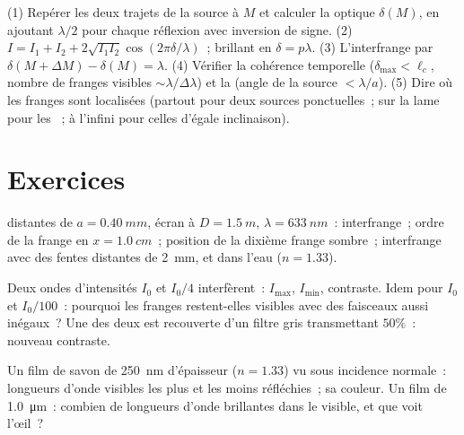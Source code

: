 \begin{method}\label{met:b2:two-wave-interference:method}
(1) Repérer les deux trajets de la source à $M$ et calculer la
 optique $\delta(M)$, en ajoutant $\lambda/2$ pour chaque réflexion
avec inversion de signe. (2) $I = I_1 + I_2 + 2\sqrt{I_1I_2}\cos(2\pi\delta/\lambda)$~;
brillant en $\delta = p\lambda$. (3) L'interfrange par $\delta(M + \Delta M) - \delta(M) =
\lambda$. (4) Vérifier la cohérence temporelle ($\delta_{\max} < \ell_c$, nombre de
franges visibles $\sim\lambda/\Delta\lambda$) et la  (angle de la source
$< \lambda/a$). (5) Dire où les franges sont localisées (partout pour deux
sources ponctuelles~; sur la lame pour les ~; à l'infini
pour celles d'égale inclinaison).
\end{method}

\section{Exercices}

\begin{exercise}[$\star$]\label{exo:b2:two-wave-interference:1}
 distantes de $a = \qty{0.40}{mm}$, écran à $D = \qty{1.5}{m}$, $\lambda =
\qty{633}{nm}$~: interfrange~; ordre de la frange en $x = \qty{1.0}{cm}$~; position
de la dixième frange sombre~; interfrange avec des fentes distantes de \qty{2}{mm},
et dans l'eau ($n = 1.33$).
\end{exercise}

\begin{exercise}[$\star$]\label{exo:b2:two-wave-interference:2}
Deux ondes d'intensités $I_0$ et $I_0/4$ interfèrent~: $I_{\max}$, $I_{\min}$,
contraste. Idem pour $I_0$ et $I_0/100$~: pourquoi les franges restent-elles visibles
avec des faisceaux aussi inégaux~? Une des deux  est recouverte d'un
filtre gris transmettant $50\%$~: nouveau contraste.
\end{exercise}

\begin{exercise}[$\star$]\label{exo:b2:two-wave-interference:3}
Un film de savon de \qty{250}{nm} d'épaisseur ($n = 1.33$) vu sous incidence normale~:
longueurs d'onde visibles les plus et les moins réfléchies~; sa couleur. Un film de
\qty{1.0}{\micro m}~: combien de longueurs d'onde brillantes dans le visible, et que
voit l'œil~?
\end{exercise}

